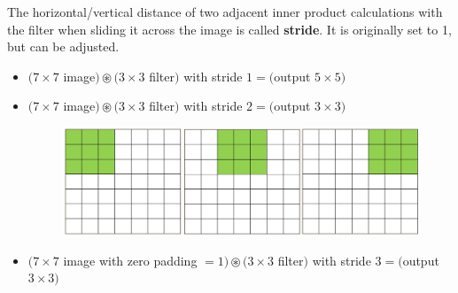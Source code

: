 \documentclass{report}
\begin{document}
\begin{concept}[5.6][Stride]
    The horizontal/vertical distance of two adjacent inner product calculations with the filter when sliding it across the image is called \textbf{stride}.
    It is originally set to 1, but can be adjusted.

    \begin{itemize}
        \item $(7 \times 7$ image$) \circledast(3 \times 3$ filter$)$ with stride $1=($output $5 \times 5)$
        \item
        $(7 \times 7$ image$) \circledast(3 \times 3$ filter$)$ with stride $2=($output $3 \times 3)$

        \begin{figure}[H]
            \centering
            \includegraphics[width=1.0\textwidth]{.././assets/5.5.png}
        \end{figure}
        \item $(7 \times 7$ image with zero padding $=1) \circledast(3 \times 3$ filter$)$ with stride $3=($output $3 \times 3)$
    \end{itemize}
\end{concept}
\end{document}
